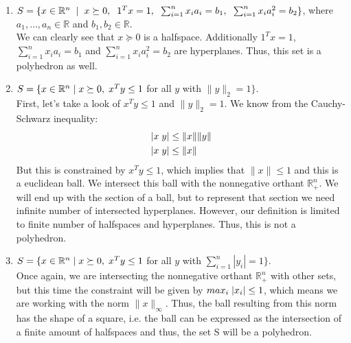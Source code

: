 \documentclass[12pt, oneside]{article}%
\def\R{{\mathbb R}}
\begin{document}
\begin{enumerate}[font=\bfseries]
\begin{enumerate}
\item $S = \{x \in \R^n \hspace{0.2cm} | \hspace{0.2cm} x \succeq 0, \hspace{0.2cm} 1^T x = 1, \hspace{0.2cm} \sum_{i=1}^n x_i a_i = b_1,\hspace{0.2cm} \sum_{i=1}^n x_i a^2_i= b_2\}$, where $a_1,\dots, a_n \in \R$ and $b_1, b_2 \in \R$.\\

We can clearly see that $x \succeq 0$ is a halfspace. Additionally $1^T x = 1$, $\sum_{i=1}^n x_i a_i = b_1$ and $\sum_{i=1}^n x_i a^2_i= b_2$ are hyperplanes. Thus, this set is a polyhedron as well.
\newpage
\item $S = \{x \in \R^n \hspace{0.1cm}| \hspace{0.1cm} x \succeq 0, \hspace{0.1cm} x^T y \leq 1$ for all $y$ with $ \|y\|_2 = 1\}.$\\

First, let's take a look of $x^T y \leq 1$ and $ \|y\|_2 = 1.$ We know from the Cauchy-Schwarz inequality:
\begin{align*}
    |x \hspace{0.1cm} y | &\leq \|x\|\|y\|\\
    |x \hspace{0.1cm} y | &\leq \|x\|
\end{align*}
But this is constrained by $x^T y \leq 1$, which implies that $\|x\| \leq 1$ and this is a euclidean ball. We intersect this ball with the nonnegative orthant $\R^n_+$. We will end up with the section of a ball, but to represent that section we need infinite number of intersected hyperplanes. However, our definition is limited to finite number of halfspaces and hyperplanes. Thus, this is not a polyhedron.\\

\item $S = \{x \in \R^n \hspace{0.1cm}| \hspace{0.1cm} x \succeq 0, \hspace{0.1cm} x^T y \leq 1$ for all $y$ with $ \sum_{i=1}^n |y_i| = 1\}.$\\

Once again, we are intersecting the nonnegative orthant $\R^n_+$ with other sets, but this time the constraint will be given by $max_i \hspace{0.1cm} |x_i| \leq 1$, which means we are working with the norm $\| x \|_\infty$. Thus, the ball resulting from this norm has the shape of a square, i.e. the ball can be expressed as the intersection of a finite amount of halfspaces and thus, the set S will be a polyhedron.
\end{enumerate}


\end{enumerate}
\end{document}
